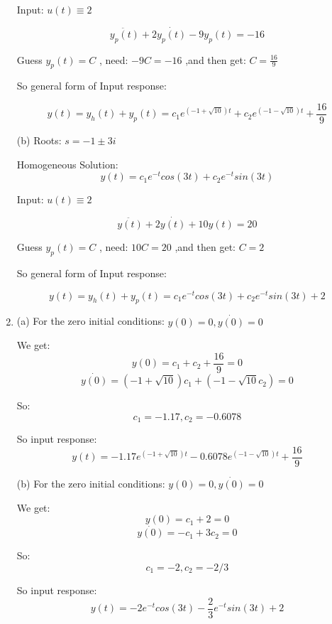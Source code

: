 \documentclass[12pt]{article}
\begin{document}
\begin{enumerate}[label=\roman*.]
        Input: $u(t) \equiv 2$

        \[\ddot{y_p(t)} + 2\dot{y_p(t)} - 9y_p(t) = -16\]

        Guess $y_p(t) = C$ , need: $-9C = -16$ ,and then get: $C = \frac{16}{9}$

        So general form of Input response:

        \[y(t) = y_h(t) + y_p(t) = c_1e^{(-1+\sqrt{10})t} + c_2e^{(-1-\sqrt{10})t} + 
            \frac{16}{9}\]

        (b)
        Roots: $s = -1 \pm 3i$

        Homogeneous Solution: 
        \[y(t) = c_1e^{-t}cos(3t) + c_2e^{-t}sin(3t)\]

        Input: $u(t) \equiv 2$

        \[\ddot{y(t)} + 2\dot{y(t)} + 10y(t) = 20\]

        Guess $y_p(t) = C$ , need: $10C = 20$ ,and then get: $C = 2$

        So general form of Input response:

        \[y(t) = y_h(t) + y_p(t) = c_1e^{-t}cos(3t) + c_2e^{-t}sin(3t) + 2\]

        \item (a)
        For the zero initial conditions: $y(0) = 0, \dot{y(0)} = 0$

        We get:
        \[y(0) = c_1 + c_2 + \frac{16}{9} = 0\]
        \[\dot{y(0)} = (-1+\sqrt{10})c_1 + (-1-\sqrt{10}c_2) = 0\]

        So:
        \[c_1 = -1.17, c_2 = -0.6078\]

        So input response:
        \[y(t) = -1.17e^{(-1+\sqrt{10})t} -0.6078e^{(-1-\sqrt{10})t} + 
            \frac{16}{9}\]


        (b)
        For the zero initial conditions: $y(0) = 0, \dot{y(0)} = 0$

        We get:
        \[y(0) = c_1 + 2 = 0\]
        \[\dot{y(0)} = -c_1 + 3c_2 = 0\]

        So:
        \[c_1 = -2, c_2 = -2/3\]

        So input response:
        \[y(t) = -2e^{-t}cos(3t) - \frac{2}{3}e^{-t}sin(3t) + 2\]


    \end{enumerate}
\end{document}
